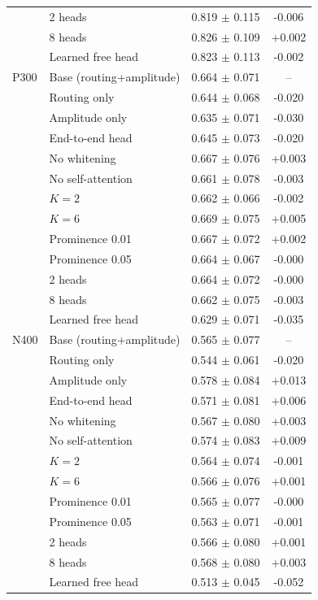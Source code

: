 \begin{table}[t]
\begin{tabular}{llcc}
 & 2 heads & 0.819 $\pm$ 0.115 & -0.006 \\
 & 8 heads & 0.826 $\pm$ 0.109 & +0.002 \\
 & Learned free head & 0.823 $\pm$ 0.113 & -0.002 \\
\midrule
P300 & Base (routing+amplitude) & 0.664 $\pm$ 0.071 & -- \\
 & Routing only & 0.644 $\pm$ 0.068 & -0.020 \\
 & Amplitude only & 0.635 $\pm$ 0.071 & -0.030 \\
 & End-to-end head & 0.645 $\pm$ 0.073 & -0.020 \\
 & No whitening & 0.667 $\pm$ 0.076 & +0.003 \\
 & No self-attention & 0.661 $\pm$ 0.078 & -0.003 \\
 & $K=2$ & 0.662 $\pm$ 0.066 & -0.002 \\
 & $K=6$ & 0.669 $\pm$ 0.075 & +0.005 \\
 & Prominence 0.01 & 0.667 $\pm$ 0.072 & +0.002 \\
 & Prominence 0.05 & 0.664 $\pm$ 0.067 & -0.000 \\
 & 2 heads & 0.664 $\pm$ 0.072 & -0.000 \\
 & 8 heads & 0.662 $\pm$ 0.075 & -0.003 \\
 & Learned free head & 0.629 $\pm$ 0.071 & -0.035 \\
\midrule
N400 & Base (routing+amplitude) & 0.565 $\pm$ 0.077 & -- \\
 & Routing only & 0.544 $\pm$ 0.061 & -0.020 \\
 & Amplitude only & 0.578 $\pm$ 0.084 & +0.013 \\
 & End-to-end head & 0.571 $\pm$ 0.081 & +0.006 \\
 & No whitening & 0.567 $\pm$ 0.080 & +0.003 \\
 & No self-attention & 0.574 $\pm$ 0.083 & +0.009 \\
 & $K=2$ & 0.564 $\pm$ 0.074 & -0.001 \\
 & $K=6$ & 0.566 $\pm$ 0.076 & +0.001 \\
 & Prominence 0.01 & 0.565 $\pm$ 0.077 & -0.000 \\
 & Prominence 0.05 & 0.563 $\pm$ 0.071 & -0.001 \\
 & 2 heads & 0.566 $\pm$ 0.080 & +0.001 \\
 & 8 heads & 0.568 $\pm$ 0.080 & +0.003 \\
 & Learned free head & 0.513 $\pm$ 0.045 & -0.052 \\
\bottomrule
\end{tabular}
\end{table}
